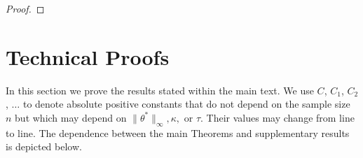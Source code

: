 \documentclass[twoside, onecolumn]{article}
\def\Hcal{\mathcal{H}}
\def\Hcal{\mathcal{H}}
\begin{document}
\begin{proof}
\end{proof}

\section{Technical Proofs}\label{sec:ProofOfTheorems}

In this section we prove the results stated within the main text. We use $C$, $C_1$, $C_2$, $\dots$ to denote absolute positive constants that do not depend on the sample size $n$ but which may depend on $\|\theta^*\|_\infty, \kappa,$ or $\tau$. Their values may change from line to line. The dependence between the main Theorems and supplementary results is depicted below.
\end{document}
